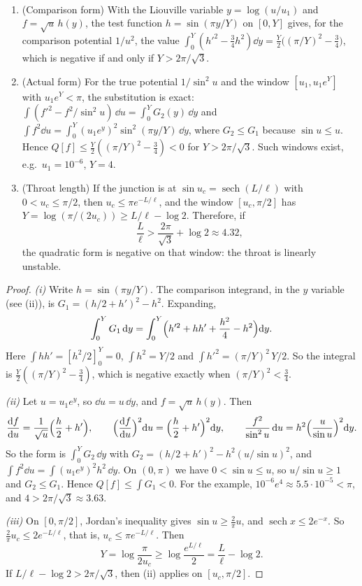 \begin{theorem}\label{thm:longthroat}\ver\
\begin{enumerate}[label=(\roman*)]
\item (Comparison form) With the Liouville variable $y=\log(u/u_1)$ and $f=\sqrt u\,h(y)$, the test function $h=\sin(\pi y/Y)$ on $[0,Y]$ gives, for the comparison potential $1/u^2$, the value $\int_0^Y(h'^2-\frac34h^2)\dd y=\frac Y2\bigl((\pi/Y)^2-\frac34\bigr)$, which is negative if and only if $Y>2\pi/\sqrt3$.
\item (Actual form) For the true potential $1/\sin^2u$ and the window $[u_1,u_1e^Y]$ with $u_1e^Y<\pi$, the substitution is exact: $\int(f'^2-f^2/\sin^2u)\,\dd u=\int_0^YG_2(y)\,\dd y$ and $\int f^2\dd u=\int_0^Y(u_1e^y)^2\sin^2(\pi y/Y)\,\dd y$, where $G_2\le G_1$ because $\sin u\le u$. Hence $Q[f]\le\frac Y2((\pi/Y)^2-\frac34)<0$ for $Y>2\pi/\sqrt3$. Such windows exist, e.g.\ $u_1=10^{-6}$, $Y=4$.
\item (Throat length) If the junction is at $\sin u_c=\operatorname{sech}(L/\ell)$ with $0<u_c\le\pi/2$, then $u_c\le\pi e^{-L/\ell}$, and the window $[u_c,\pi/2]$ has $Y=\log(\pi/(2u_c))\ge L/\ell-\log2$. Therefore, if
\[
\frac L\ell>\frac{2\pi}{\sqrt3}+\log2\approx4.32,
\]
the quadratic form is negative on that window: the throat is linearly unstable.
\end{enumerate}
\end{theorem}
\begin{proof}
\emph{(i)} Write $h=\sin(\pi y/Y)$. The comparison integrand, in the $y$ variable (see (ii)), is $G_1=(h/2+h')^2-h^2$. Expanding,
\[
\int_0^YG_1\,\mathrm{d} y=\int_0^Y\Bigl(h'^2+hh'+\frac{h^2}4-h^2\Bigr)\mathrm{d} y .
\]
Here $\int hh'=[h^2/2]_0^Y=0$, $\int h^2=Y/2$ and $\int h'^2=(\pi/Y)^2\,Y/2$. So the integral is $\frac Y2((\pi/Y)^2-\frac34)$, which is negative exactly when $(\pi/Y)^2<\frac34$.

\emph{(ii)} Let $u=u_1e^y$, so $\dd u=u\,\dd y$, and $f=\sqrt u\,h(y)$. Then
\[
\frac{\mathrm{d} f}{\mathrm{d} u}=\frac1{\sqrt u}\Bigl(\frac h2+h'\Bigr),\qquad\Bigl(\frac{\mathrm{d} f}{\mathrm{d} u}\Bigr)^2\mathrm{d} u=\Bigl(\frac h2+h'\Bigr)^2\mathrm{d} y,\qquad\frac{f^2}{\sin^2u}\,\mathrm{d} u=h^2\Bigl(\frac u{\sin u}\Bigr)^2\mathrm{d} y .
\]
So the form is $\int_0^YG_2\,\dd y$ with $G_2=(h/2+h')^2-h^2(u/\sin u)^2$, and $\int f^2\dd u=\int(u_1e^y)^2h^2\,\dd y$. On $(0,\pi)$ we have $0<\sin u\le u$, so $u/\sin u\ge1$ and $G_2\le G_1$. Hence $Q[f]\le\int G_1<0$. For the example, $10^{-6}e^4\approx5.5\cdot10^{-5}<\pi$, and $4>2\pi/\sqrt3\approx3.63$.

\emph{(iii)} On $[0,\pi/2]$, Jordan's inequality gives $\sin u\ge\frac2\pi u$, and $\operatorname{sech}x\le2e^{-x}$. So $\frac2\pi u_c\le2e^{-L/\ell}$, that is, $u_c\le\pi e^{-L/\ell}$. Then
\[
Y=\log\frac\pi{2u_c}\ge\log\frac{e^{L/\ell}}2=\frac L\ell-\log2 .
\]
If $L/\ell-\log2>2\pi/\sqrt3$, then (ii) applies on $[u_c,\pi/2]$.
\end{proof}


